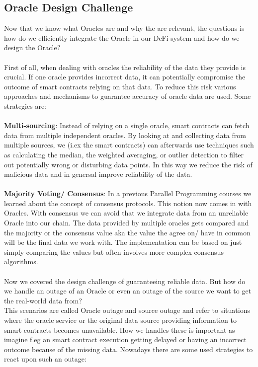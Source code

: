 \documentclass{article}
\begin{document}
\subsection{Oracle Design Challenge}
Now that we know what Oracles are and why the are relevant, the questions is how do we efficiently integrate the Oracle in our DeFi system and how do we design the Oracle?\\
\\
First of all, when dealing with oracles the reliability of the data they provide is crucial. If one oracle provides incorrect data, it can potentially compromise the outcome of smart contracts relying on that data. To reduce this risk various approaches and mechanisms to guarantee accuracy of oracle data are used. Some strategies are:\\
\\
\textbf{Multi-sourcing}: Instead of relying on a single oracle, smart contracts can fetch data from multiple independent oracles. By looking at and collecting data from multiple sources, we (i.ex the smart contracts) can afterwards use techniques such as calculating the median, the weighted averaging, or outlier detection to filter out potentially wrong or disturbing data points. In this way we reduce the risk of malicious data  and in genersal improve reliability of the data.\\
\\
\textbf{Majority Voting/ Consensus}: In a previous Parallel Programming courses we learned about the concept of consensus protocols. This notion now comes in with Oracles. With consensus we can avoid that we integrate data from an unreliable Oracle into our chain. The data provided by multiple oracles gets compared and the majority or the consensus value aka the value the agree on/ have in common will be the final data we work with.  The implementation can be based on just simply comparing the values but often involves more complex consensus algorithms.\\
\\
Now we covered the design challenge of guaranteeing reliable data. But how do we handle an outage of an Oracle or even an outage of the source we want to get the real-world data from?
\\
This scenarios are called Oracle outage and source outage and refer to situations where the oracle service or the original data source providing information to smart contracts becomes unavailable. How we handles these is important as imagine f.eg an smart contract execution getting delayed or having an incorrect outcome because of the missing data. Nowadays there are some used strategies to react upon such an outage:\\
\end{document}
